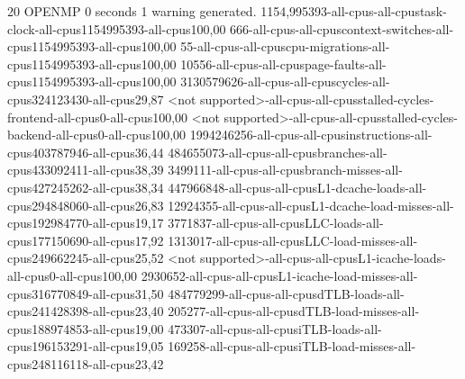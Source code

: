 
20
OPENMP
0 seconds
1 warning generated.
1154,995393-all-cpus-all-cpustask-clock-all-cpus1154995393-all-cpus100,00
666-all-cpus-all-cpuscontext-switches-all-cpus1154995393-all-cpus100,00
55-all-cpus-all-cpuscpu-migrations-all-cpus1154995393-all-cpus100,00
10556-all-cpus-all-cpuspage-faults-all-cpus1154995393-all-cpus100,00
3130579626-all-cpus-all-cpuscycles-all-cpus324123430-all-cpus29,87
<not supported>-all-cpus-all-cpusstalled-cycles-frontend-all-cpus0-all-cpus100,00
<not supported>-all-cpus-all-cpusstalled-cycles-backend-all-cpus0-all-cpus100,00
1994246256-all-cpus-all-cpusinstructions-all-cpus403787946-all-cpus36,44
484655073-all-cpus-all-cpusbranches-all-cpus433092411-all-cpus38,39
3499111-all-cpus-all-cpusbranch-misses-all-cpus427245262-all-cpus38,34
447966848-all-cpus-all-cpusL1-dcache-loads-all-cpus294848060-all-cpus26,83
12924355-all-cpus-all-cpusL1-dcache-load-misses-all-cpus192984770-all-cpus19,17
3771837-all-cpus-all-cpusLLC-loads-all-cpus177150690-all-cpus17,92
1313017-all-cpus-all-cpusLLC-load-misses-all-cpus249662245-all-cpus25,52
<not supported>-all-cpus-all-cpusL1-icache-loads-all-cpus0-all-cpus100,00
2930652-all-cpus-all-cpusL1-icache-load-misses-all-cpus316770849-all-cpus31,50
484779299-all-cpus-all-cpusdTLB-loads-all-cpus241428398-all-cpus23,40
205277-all-cpus-all-cpusdTLB-load-misses-all-cpus188974853-all-cpus19,00
473307-all-cpus-all-cpusiTLB-loads-all-cpus196153291-all-cpus19,05
169258-all-cpus-all-cpusiTLB-load-misses-all-cpus248116118-all-cpus23,42
